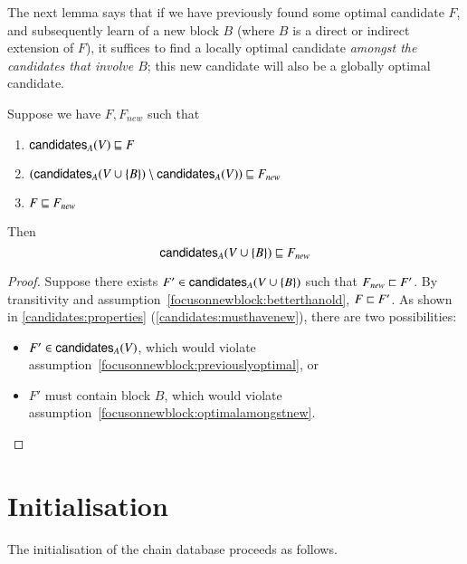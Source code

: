 The next lemma says that if we have previously found some optimal candidate $F$,
and subsequently learn of a new block $B$ (where $B$ is a direct or indirect
extension of $F$), it suffices to find a locally optimal candidate \emph{amongst
the candidates that involve $B$}; this new candidate will also be a globally
optimal candidate.

\begin{lemma}
\label{focusonnewblock}
Suppose we have $F, F_\mathit{new}$ such that
\begin{enumerate}
\item \label{focusonnewblock:previouslyoptimal}
$\mathsf{candidates}_A(V) \mathrel{\sqsubseteq} F$
\item \label{focusonnewblock:optimalamongstnew}
$(\mathsf{candidates}_A(V \cup \{B\}) \setminus \mathsf{candidates}_A(V)) \mathrel{\sqsubseteq} F_\mathit{new}$
\item \label{focusonnewblock:betterthanold}
$F \mathrel{\sqsubseteq} F_\mathit{new}$
\end{enumerate}
Then
\begin{equation*}
\mathsf{candidates}_A(V \cup \{B\}) \mathrel{\sqsubseteq} F_\mathit{new}
\end{equation*}
\end{lemma}

\begin{proof}
Suppose there exists $F' \in \mathsf{candidates}_A(V \cup \{B\})$ such that
$F_\mathit{new} \mathrel{\sqsubset} F'$. By transitivity and
assumption~\ref{focusonnewblock:betterthanold}, $F \mathrel{\sqsubset} F'$. As
shown in \cref{candidates:properties} (\cref{candidates:musthavenew}), there are two possibilities:

\begin{itemize}
\item $F' \in \mathsf{candidates}_A(V)$, which would violate
assumption~\cref{focusonnewblock:previouslyoptimal}, or
\item $F'$ must contain block $B$, which would violate
assumption~\cref{focusonnewblock:optimalamongstnew}.
\end{itemize}
\end{proof}

\section{Initialisation}
\label{chainsel:init}

The initialisation of the chain database proceeds as follows.

